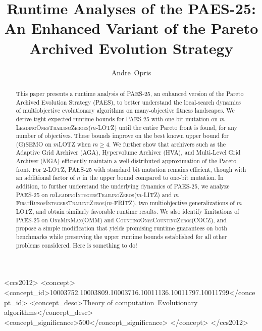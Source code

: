 \documentclass[
sigconf = false, %
review = false, %
screen = true, %
anonymous = true, %
format=acmsmall
]{acmart}
\author{Andre~Opris}
\affiliation{
    \institution{University of Passau
    \city{Passau}
    \country{Germany}
    }
}
\title{Runtime Analyses of the PAES-25: An Enhanced Variant of the Pareto Archived Evolution Strategy}
\newcommand{\mLOTZ}{\ensuremath{m}\text{-}\textsc{LOTZ}\xspace}
\newcommand{\mLOTZFULL}{\ensuremath{m}\text{-}\textsc{LeadingOnesTrailingZeroes}\xspace}
\newcommand{\mLITZFULL}{\ensuremath{m}\text{-}\textsc{LeadingIntegersTrailingZeros}\xspace}
\newcommand{\mFRITZFULL}{\ensuremath{m}\text{-}\textsc{FirstRunofIntegersTrailingZeros}\xspace}
\newcommand{\OMMFULL}{\textsc{OneMinMax}\xspace}
\newcommand{\COCZFULL}{\textsc{CountingOnesCountingZeros}\xspace}
\newcommand{\PAES}{PAES-25\xspace}
\begin{document}
\renewcommand{\shortauthors}{xxx}

\begin{abstract}
This paper presents a runtime analysis of \PAES, an enhanced version of the Pareto Archived Evolution Strategy (PAES), to better understand the local-search dynamics of multiobjective evolutionary algorithms on many-objective fitness landscapes. We derive tight expected runtime bounds for \PAES with one-bit mutation on \mLOTZFULL ($m$-LOTZ) until the entire Pareto front is found, for any number of objectives. These bounds improve on the best known upper bound for (G)SEMO on \mLOTZ when $m \ge 4$.
We further show that archivers such as the Adaptive Grid Archiver (AGA), Hypervolume Archiver (HVA), and Multi-Level Grid Archiver (MGA) efficiently maintain a well-distributed approximation of the Pareto front. For $2$-LOTZ, \PAES with standard bit mutation remains efficient, though with an additional factor of $n$ in the upper bound compared to one-bit mutation.
In addition, to further understand the underlying dynamics of \PAES, we analyze \PAES on \mLITZFULL ($m$-LITZ) and \mFRITZFULL ($m$-FRITZ), two multiobjective generalizations of \mLOTZ, and obtain similarly favorable runtime results. We also identify limitations of \PAES on \OMMFULL (OMM) and \COCZFULL (COCZ), and propose a simple modification that yields promising runtime guarantees on both benchmarks while preserving the upper runtime bounds established for all other problems considered. Here is something to do!
\end{abstract}
\begin{CCSXML}
<ccs2012>
<concept>
<concept_id>10003752.10003809.10003716.10011136.10011797.10011799</concept_id>
<concept_desc>Theory of computation~Evolutionary algorithms</concept_desc>
<concept_significance>500</concept_significance>
</concept>
</ccs2012>
\end{CCSXML}



\maketitle
\end{document}

